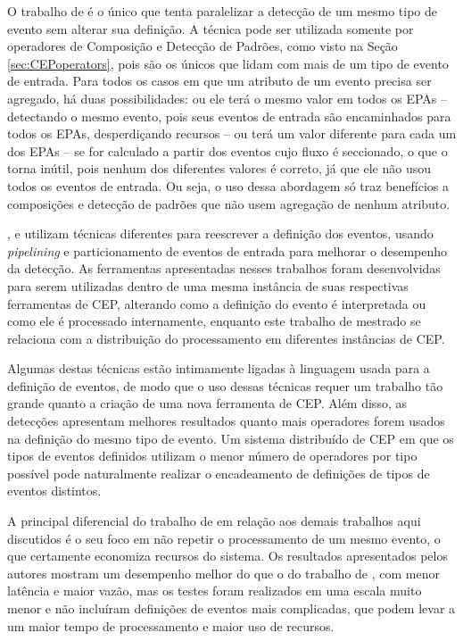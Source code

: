O trabalho de \cite{doi:10.1177/1550147717728626} é o único que tenta paralelizar a detecção de um mesmo tipo de evento sem alterar sua definição. A técnica pode ser utilizada somente por operadores de Composição e Detecção de Padrões, como visto na Seção \ref{sec:CEPoperators}, pois são os únicos que lidam com mais de um tipo de evento de entrada. Para todos os casos em que um atributo de um evento precisa ser agregado, há duas possibilidades: ou ele terá o mesmo valor em todos os EPAs – detectando o mesmo evento, pois seus eventos de entrada são encaminhados para todos os EPAs, desperdiçando recursos – ou terá um valor diferente para cada um dos EPAs – se for calculado a partir dos eventos cujo fluxo é seccionado, o que o torna inútil, pois nenhum dos diferentes valores é correto, já que ele não usou todos os eventos de entrada. Ou seja, o uso dessa abordagem só traz benefícios a composições e detecção de padrões que não usem agregação de nenhum atributo.

\cite{JAYASEKARA201542}, \cite{Schultz-Moller:2009:DCE:1619258.1619264} e \cite{Balkesen:2013:RRI:2488222.2488257} utilizam técnicas diferentes para reescrever a definição dos eventos, usando \textit{pipelining} e particionamento de eventos de entrada para melhorar o desempenho da detecção. 
As ferramentas apresentadas nesses trabalhos foram desenvolvidas para serem utilizadas dentro de uma mesma instância de suas respectivas ferramentas de CEP, alterando como a definição do evento é interpretada ou como ele é processado internamente, enquanto este trabalho de mestrado se relaciona com a distribuição do processamento em diferentes instâncias de CEP.

Algumas destas técnicas%
 estão intimamente ligadas à linguagem usada para a definição de eventos, de modo que o uso dessas técnicas requer um trabalho tão grande quanto a criação de uma nova ferramenta de CEP. Além disso, as detecções apresentam melhores resultados quanto mais operadores forem usados na definição do mesmo tipo de evento.
Um sistema distribuído de CEP em que os tipos de eventos definidos utilizam o menor número de operadores por tipo possível pode naturalmente realizar o encadeamento de definições de tipos de eventos distintos. 

A principal diferencial do trabalho de \cite{7129184} em relação aos demais trabalhos aqui discutidos é o seu foco em não repetir o processamento de um mesmo evento, o que certamente economiza recursos do sistema. Os resultados apresentados pelos autores mostram um desempenho melhor do que o do trabalho de \cite{Isoyama:2012:SCE:2335484.2335498}, com menor latência e maior vazão, mas os testes foram realizados em uma escala muito menor e não incluíram definições de eventos mais complicadas, que podem levar a um maior tempo de processamento e maior uso de recursos. 

